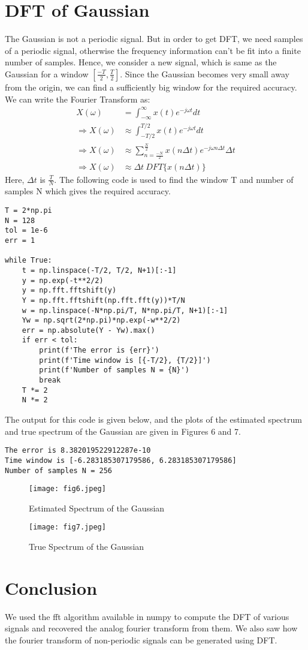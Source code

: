 \documentclass[12pt, a4paper]{article}
\begin{document}
\section{DFT of Gaussian}
The Gaussian is not a periodic signal. But in order to get DFT, we need samples of a periodic signal, otherwise the frequency information can't be fit into a finite number of samples. Hence, we consider a new signal, which is same as the Gaussian for a window $[\frac{-T}{2}, \frac{T}{2}]$. Since the Gaussian becomes very small away from the origin, we can find a sufficiently big window for the required accuracy. We can write the Fourier Transform as:
\begin{align*}
X(\omega) &= \int_{-\infty}^{\infty} x(t)e^{-j\omega t} dt \\
\Rightarrow X(\omega) &\approx \int_{-T/2}^{T/2} x(t)e^{-j\omega t} dt \\
\Rightarrow X(\omega) &\approx \sum\limits_{n = \frac{-N}{2}}^{\frac{N}{2}} x(n\Delta t)e^{-j\omega n\Delta t} \Delta t \\
\Rightarrow X(\omega) &\approx \Delta t\ DFT\{x(n\Delta t)\}
\end{align*}
Here, $\Delta t$ is $\frac{T}{N}$. The following code is used to find the window T and number of samples N which gives the required accuracy.
\begin{lstlisting}
T = 2*np.pi
N = 128
tol = 1e-6
err = 1

while True:
    t = np.linspace(-T/2, T/2, N+1)[:-1]
    y = np.exp(-t**2/2)
    y = np.fft.fftshift(y)
    Y = np.fft.fftshift(np.fft.fft(y))*T/N
    w = np.linspace(-N*np.pi/T, N*np.pi/T, N+1)[:-1]
    Yw = np.sqrt(2*np.pi)*np.exp(-w**2/2)
    err = np.absolute(Y - Yw).max()
    if err < tol:
        print(f'The error is {err}')
        print(f'Time window is [{-T/2}, {T/2}]')
        print(f'Number of samples N = {N}')
        break
    T *= 2
    N *= 2
\end{lstlisting}
The output for this code is given below, and the plots of the estimated spectrum and true spectrum of the Gaussian are given in Figures 6 and 7.
\begin{verbatim}
The error is 8.382019522912287e-10
Time window is [-6.283185307179586, 6.283185307179586]
Number of samples N = 256
\end{verbatim}

\begin{figure}
\centering
\texttt{[image: fig6.jpeg]}
\caption{Estimated Spectrum of the Gaussian}
\end{figure}

\begin{figure}
\centering
\texttt{[image: fig7.jpeg]}
\caption{True Spectrum of the Gaussian}
\end{figure}

\section*{Conclusion}
We used the fft algorithm available in numpy to compute the DFT of various signals and recovered the analog fourier transform from them. We also saw how the fourier transform of non-periodic signals can be generated using DFT.
\end{document}
